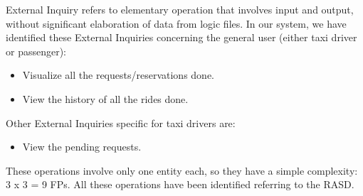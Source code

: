 External Inquiry refers to elementary operation that involves input and output, without significant elaboration of data from logic files.
\newline
In our system, we have identified these External Inquiries concerning the general user (either taxi driver or passenger):
\begin{itemize}
    \item Visualize all the requests/reservations done. 
	\item View the history of all the rides done. 
\end{itemize}

Other External Inquiries specific for taxi drivers are:
\begin{itemize}
    \item View the pending requests. 
\end{itemize}
These operations involve only one entity each, so they have a simple complexity: 3 x 3 = 9 FPs.
\newline
All these operations have been identified referring to the RASD.